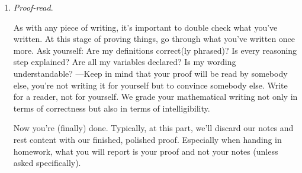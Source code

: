 \begin{enumerate}[{\thesection}.1]
\begin{enumerate}[\thesection.{7}.1]
				When you claim a result, you will have to follow up with a proof. 		The proof typically comes afterwards in a separate proof environment. You begin the proof by declaring your variables and listing your assumptions (possible naming them for ease of reference). Then you reason carefully, step-by-step to the desired result:

				\begin{proof}
		Let $n$ be a natural number and assume $n$ is prime. By definition, this means that (i) $1<n$ and (ii) there are no natural numbers $k,l<n$ such that $n=k\cdot l$. We want to show that if $n>2$, then $n$ is odd. So, suppose that $n>2$. By definition, for $n$ to be odd would mean that $n$ is not even. We claim that given our assumptions, $n$ cannot be even and hence must be odd. For suppose that $n$ is even. By definition, this would mean that there exists an $m$ such that $n=2m$. But this would contradict condition (ii) for $n$ being prime: just let $k=2$ and $l=m$. Note that $1<n$ and $n=2m$, it follows that $m<n$ and we have $2<n$ by assumption . So, $n$ cannot be even, which means that $n$ must be odd.
		\end{proof}
				
				Note the $\square$ at the end of the proof. It marks the end of the proof and is read Q.E.D., i.e. \emph{quod erat demonstrandum} (what was to be shown).

		We've completed our proof. 
		
		\item \emph{Proof-read}.
		
		As with any piece of writing, it's important to double check what you've written. At this stage of proving things, go through what you've written once more. Ask yourself: Are my definitions correct(ly phrased)? Is every reasoning step explained? Are all my variables declared? Is my wording understandable? ---Keep in mind that your proof will be read by somebody else, you're not writing it for yourself but to convince somebody else. Write for a reader, not for yourself. We grade your mathematical writing not only in terms of correctness but also in terms of intelligibility. 
				
		Now you're (finally) done. Typically, at this part, we'll discard our notes and rest content with our finished, polished proof. Especially when handing in homework, what you will report is your proof and not your notes (unless asked specifically). 
		
		\end{enumerate}
		

\end{enumerate}
